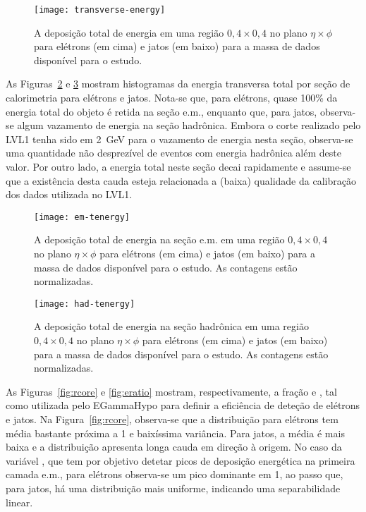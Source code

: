 \begin{figure}
\begin{center}
\texttt{[image: transverse-energy]}
\end{center}
\caption{A deposição total de energia em uma região $0,4 \times 0,4$ no plano
$\eta\times\phi$ para elétrons (em cima) e jatos (em baixo) para a massa de
dados disponível para o estudo.}
\label{fig:transverse-energy}
\end{figure}

As Figuras~\ref{fig:em-tenergy} e \ref{fig:had-tenergy} mostram histogramas da
energia transversa total por seção de calorimetria para e\-lé\-trons e
jatos. Nota-se que, para elétrons, quase 100\% da energia total do objeto é
retida na seção e.m., enquanto que, para jatos, observa-se algum vazamento de
energia na seção hadrônica. Embora o corte realizado pelo LVL1 tenha sido em
2~GeV para o vazamento de energia nesta seção, observa-se uma quantidade não
desprezível de eventos com energia hadrônica além deste valor. Por outro lado,
a energia total neste seção decai rapidamente e assume-se que a existência
desta cauda esteja relacionada a (baixa) qualidade da calibração dos dados
utilizada no LVL1.

\begin{figure}
\begin{center}
\texttt{[image: em-tenergy]}
\end{center}
\caption{A deposição total de energia na seção e.m. em uma região $0,4 \times
0,4$ no plano $\eta\times\phi$ para elétrons (em cima) e jatos (em baixo) para
a massa de dados disponível para o estudo. As contagens estão normalizadas.}
\label{fig:em-tenergy}
\end{figure}

\begin{figure}
\begin{center}
\texttt{[image: had-tenergy]}
\end{center}
\caption{A deposição total de energia na seção hadrônica em uma região $0,4 \times
0,4$ no plano $\eta\times\phi$ para elétrons (em cima) e jatos (em baixo) para
a massa de dados disponível para o estudo. As contagens estão normalizadas.}
\label{fig:had-tenergy}
\end{figure}

As Figuras~\ref{fig:rcore} e \ref{fig:eratio} mostram, respectivamente, a
fração \rcore e \eratio, tal como utilizada pelo EGammaHypo para definir a
eficiência de deteção de elétrons e jatos. Na Figura~\ref{fig:rcore},
observa-se que a distribuição para elétrons tem média bastante próxima a 1 e
baixíssima variância. Para jatos, a média é mais baixa e a distribuição
apresenta longa cauda em direção à origem. No caso da variável \eratio, que
tem por objetivo detetar picos de deposição energética na primeira camada
e.m., para elétrons observa-se um pico dominante em 1, ao passo que, para
jatos, há uma distribuição mais uniforme, indicando uma separabilidade
linear.

